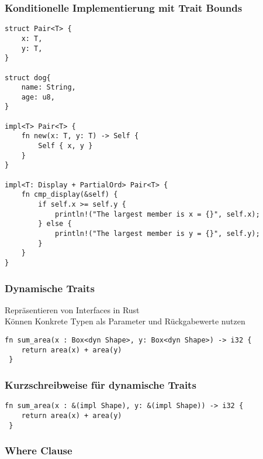\documentclass[a4paper, 1ppt]{article}
\begin{document}
\subsubsection{Konditionelle Implementierung mit Trait Bounds}
\begin{verbatim}
struct Pair<T> {
    x: T,
    y: T,
}

struct dog{
    name: String,
    age: u8,
}

impl<T> Pair<T> {
    fn new(x: T, y: T) -> Self {
        Self { x, y }
    }
}

impl<T: Display + PartialOrd> Pair<T> {
    fn cmp_display(&self) {
        if self.x >= self.y {
            println!("The largest member is x = {}", self.x);
        } else {
            println!("The largest member is y = {}", self.y);
        }
    }
}
\end{verbatim}
\subsubsection{Dynamische Traits}
Repräsentieren von Interfaces in Rust \\
Können Konkrete Typen als Parameter und Rückgabewerte nutzen
\begin{verbatim}
fn sum_area(x : Box<dyn Shape>, y: Box<dyn Shape>) -> i32 {
    return area(x) + area(y)
 }
\end{verbatim}
\subsubsection{Kurzschreibweise für dynamische Traits}
\begin{verbatim}
fn sum_area(x : &(impl Shape), y: &(impl Shape)) -> i32 {
    return area(x) + area(y)
 }
\end{verbatim}
\subsubsection{Where Clause}
\end{document}
